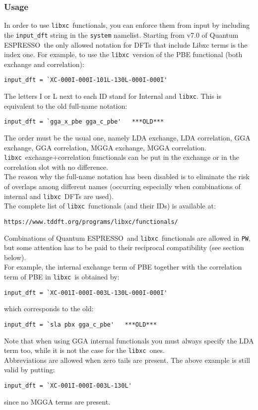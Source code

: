 \documentclass[12pt,a4paper]{article}
\def\qe{{\sc Quantum ESPRESSO}}
\def\libxc{\texttt{libxc}}
\begin{document}
\subsubsection{Usage}
In order to use \libxc\ functionals, you can enforce them from input by including the \texttt{input\_dft} string in the \texttt{system} namelist. Starting from v7.0 of \qe\ the only allowed notation for DFTs that include Libxc terms is the index one. For example, to use the \libxc\ version of the PBE functional (both exchange and correlation):
\begin{verbatim}
input_dft = `XC-000I-000I-101L-130L-000I-000I'
\end{verbatim}
The letters I or L next to each ID stand for Internal and \libxc. This is equivalent to the old full-name notation:
\begin{verbatim}
input_dft = `gga_x_pbe gga_c_pbe'   ***OLD***
\end{verbatim}
The order must be the usual one, namely LDA exchange, LDA correlation, GGA exchange, GGA correlation, MGGA exchange, MGGA correlation. \libxc\ exchange+correlation functionals can be put in the exchange or in the correlation slot with no difference.\\
The reason why the full-name notation has been disabled is to eliminate the risk of overlaps among different names (occurring especially when combinations of internal and \libxc\ DFTs are used).\\
%
The complete list of \libxc\ functionals (and their IDs) is available at:
\begin{verbatim}
https://www.tddft.org/programs/libxc/functionals/
\end{verbatim}
%
Combinations of \qe\ and \libxc\ functionals are allowed in \texttt{PW}, but some attention has to be paid to their reciprocal compatibility (see section below).\\
For example, the internal exchange term of PBE together with the correlation term of PBE in \libxc\ is obtained by:
\begin{verbatim}
input_dft = `XC-001I-000I-003L-130L-000I-000I'
\end{verbatim}
which corresponds to the old:
\begin{verbatim}
input_dft = `sla pbx gga_c_pbe'   ***OLD***
\end{verbatim}
Note that when using GGA internal functionals you must always specify the LDA term too, while it is not the case for the \libxc\ ones.\\
Abbreviations are allowed when zero tails are present. The above example is still valid by putting:
\begin{verbatim}
input_dft = `XC-001I-000I-003L-130L'
\end{verbatim}
since no MGGA terms are present.
%
\end{document}
